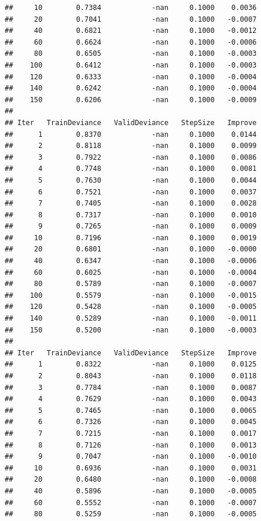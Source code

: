 \documentclass[]{book}
\begin{document}
\begin{verbatim}
##     10        0.7384            -nan     0.1000    0.0036
##     20        0.7041            -nan     0.1000   -0.0007
##     40        0.6821            -nan     0.1000   -0.0012
##     60        0.6624            -nan     0.1000   -0.0006
##     80        0.6505            -nan     0.1000   -0.0003
##    100        0.6412            -nan     0.1000   -0.0003
##    120        0.6333            -nan     0.1000   -0.0004
##    140        0.6242            -nan     0.1000   -0.0004
##    150        0.6206            -nan     0.1000   -0.0009
## 
## Iter   TrainDeviance   ValidDeviance   StepSize   Improve
##      1        0.8370            -nan     0.1000    0.0144
##      2        0.8118            -nan     0.1000    0.0099
##      3        0.7922            -nan     0.1000    0.0086
##      4        0.7748            -nan     0.1000    0.0081
##      5        0.7630            -nan     0.1000    0.0044
##      6        0.7521            -nan     0.1000    0.0037
##      7        0.7405            -nan     0.1000    0.0028
##      8        0.7317            -nan     0.1000    0.0010
##      9        0.7265            -nan     0.1000    0.0009
##     10        0.7196            -nan     0.1000    0.0019
##     20        0.6801            -nan     0.1000   -0.0000
##     40        0.6347            -nan     0.1000   -0.0006
##     60        0.6025            -nan     0.1000   -0.0004
##     80        0.5789            -nan     0.1000   -0.0007
##    100        0.5579            -nan     0.1000   -0.0015
##    120        0.5428            -nan     0.1000   -0.0005
##    140        0.5289            -nan     0.1000   -0.0011
##    150        0.5200            -nan     0.1000   -0.0003
## 
## Iter   TrainDeviance   ValidDeviance   StepSize   Improve
##      1        0.8322            -nan     0.1000    0.0125
##      2        0.8043            -nan     0.1000    0.0118
##      3        0.7784            -nan     0.1000    0.0087
##      4        0.7629            -nan     0.1000    0.0043
##      5        0.7465            -nan     0.1000    0.0065
##      6        0.7326            -nan     0.1000    0.0045
##      7        0.7215            -nan     0.1000    0.0017
##      8        0.7126            -nan     0.1000    0.0013
##      9        0.7047            -nan     0.1000   -0.0010
##     10        0.6936            -nan     0.1000    0.0031
##     20        0.6480            -nan     0.1000   -0.0008
##     40        0.5896            -nan     0.1000   -0.0005
##     60        0.5552            -nan     0.1000   -0.0007
##     80        0.5259            -nan     0.1000   -0.0005

\end{verbatim}
\end{document}
